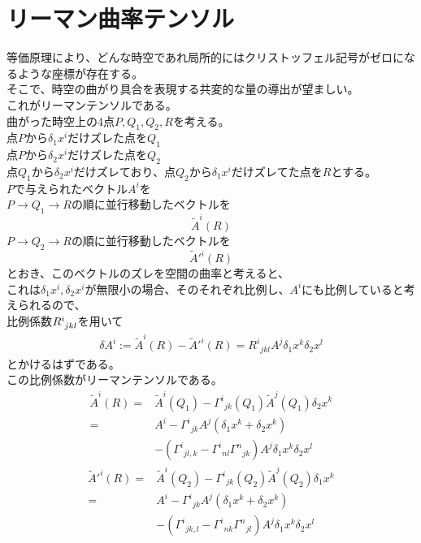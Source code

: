 \documentclass[dvipdfmx]{report} %
\begin{document}
\section{
    リーマン曲率テンソル
}
等価原理により、どんな時空であれ局所的にはクリストッフェル記号がゼロになるような座標が存在する。\\
そこで、時空の曲がり具合を表現する共変的な量の導出が望ましい。\\
これがリーマンテンソルである。\\
曲がった時空上の4点$P, Q_1, Q_2, R$を考える。\\
点$P$から$\delta_1 x^i$だけズレた点を$Q_1$\\
点$P$から$\delta_2 x^i$だけズレた点を$Q_2$\\
点$Q_1$から$\delta_2 x^i$だけズレており、点$Q_2$から$\delta_1 x^i$だけズレてた点を$R$とする。\\
$P$で与えられたベクトル$A^i$を\\
$P \to Q_1 \to R$の順に並行移動したベクトルを
\[ \tilde{A}^i\left(R\right) \]
$P \to Q_2 \to R$の順に並行移動したベクトルを
\[ \tilde{A}'^i\left(R\right) \]
とおき、このベクトルのズレを空間の曲率と考えると、\\
これは$\delta_1 x^i, \delta_2 x^i$が無限小の場合、そのそれぞれ比例し、$A^i$にも比例していると考えられるので、\\
比例係数$\tensor{R}{^i_{jkl}}$を用いて
\begin{equation*}
\begin{split}
\delta A^i:=\tilde{A}^i\left(R\right)-\tilde{A}'^i\left(R\right)=R^i{}_{jkl} A^j \delta_1 x^k \delta_2 x^{l}
\end{split}
\end{equation*}
とかけるはずである。\\
この比例係数がリーマンテンソルである。\\
\begin{equation}
\begin{split}
\tilde{A}^i\left(R\right) =& \tilde{A}^i\left(Q_1\right)-\Gamma^i{}_{jk}\left(Q_1\right) \tilde{A}^j\left(Q_1\right) \delta_2 x^k \\
=& A^i-\Gamma^i{}_{jk} A^j\left(\delta_1 x^k+\delta_2 x^k\right) \\
& -\left(\Gamma^i{}_{j l, k}-\Gamma^i{}_{n l} \Gamma^n{}_{jk}\right) A^j \delta_1 x^k \delta_2 x^{l}
\end{split}
\end{equation}
\begin{equation}
\begin{split}
\tilde{A}'^i\left(R\right)= & \tilde{A}^i\left(Q_2\right)-\Gamma^i{}_{jk}\left(Q_2\right) \tilde{A}^j\left(Q_2\right) \delta_1 x^k \\
= & A^i-\Gamma^i{}_{jk} A^j\left(\delta_1 x^k+\delta_2 x^k\right) \\
& -\left(\Gamma^i{}_{jk, l}-\Gamma^i{}_{nk} \Gamma^n{}_{jl}\right) A^j \delta_1 x^k \delta_2 x^{l}
\end{split}
\end{equation}
\end{document}
